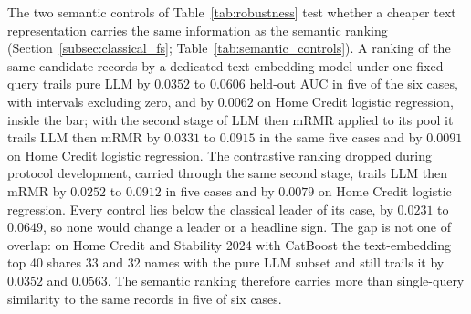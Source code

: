 \documentclass[final,5p,twocolumn]{elsarticle}
\begin{document}
The two semantic controls of Table~\ref{tab:robustness} test whether a cheaper text representation carries the same information as the semantic ranking (Section~\ref{subsec:classical_fs}; Table~\ref{tab:semantic_controls}). A ranking of the same candidate records by a dedicated text-embedding model under one fixed query trails pure LLM by $0.0352$ to $0.0606$ held-out AUC in five of the six cases, with intervals excluding zero, and by $0.0062$ on Home Credit logistic regression, inside the bar; with the second stage of LLM then mRMR applied to its pool it trails LLM then mRMR by $0.0331$ to $0.0915$ in the same five cases and by $0.0091$ on Home Credit logistic regression. The contrastive ranking dropped during protocol development, carried through the same second stage, trails LLM then mRMR by $0.0252$ to $0.0912$ in five cases and by $0.0079$ on Home Credit logistic regression. Every control lies below the classical leader of its case, by $0.0231$ to $0.0649$, so none would change a leader or a headline sign. The gap is not one of overlap: on Home Credit and Stability 2024 with CatBoost the text-embedding top 40 shares 33 and 32 names with the pure LLM subset and still trails it by $0.0352$ and $0.0563$. The semantic ranking therefore carries more than single-query similarity to the same records in five of six cases.
\end{document}
